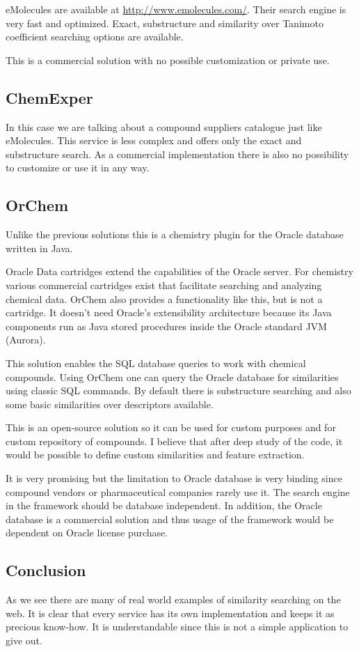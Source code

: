 \documentclass[thesis=M,english]{FITthesis}[2012/10/20]
\begin{document}
eMolecules are available at \url{http://www.emolecules.com/}. Their search engine is very fast and optimized. Exact, substructure and similarity over Tanimoto coefficient searching options are available.

This is a commercial solution with no possible customization or private use.

\subsection{ChemExper}
In this case we are talking about a compound suppliers catalogue just like eMolecules. This service is less complex and offers only the exact and substructure search. As a commercial implementation there is also no possibility to customize or use it in any way.

\subsection{OrChem}
Unlike the previous solutions this is a chemistry plugin for the Oracle database written in Java. 

Oracle Data cartridges extend the capabilities of the Oracle server. For chemistry various commercial cartridges exist that facilitate searching and analyzing chemical data. OrChem also provides a functionality like this, but is not a cartridge. It doesn't need Oracle's extensibility architecture because its Java components run as Java stored procedures inside the Oracle standard JVM (Aurora).\cite{orchem}

This solution enables the SQL database queries to work with chemical compounds. Using OrChem one can query the Oracle database for similarities using classic SQL commands. By default there is substructure searching and also some basic similarities over descriptors available.

This is an open-source solution so it can be used for custom purposes and for custom repository of compounds. I believe that after deep study of the code, it would be possible to define custom similarities and feature extraction.

It is very promising but the limitation to Oracle database is very binding since compound vendors or pharmaceutical companies rarely use it. The search engine in the framework should be database independent. In addition, the Oracle database is a commercial solution and thus usage of the framework would be dependent on Oracle license purchase.

\subsection{Conclusion}
As we see there are many of real world examples of similarity searching on the web. It is clear that every service has its own implementation and keeps it as precious know-how. It is understandable since this is not a simple application to give out.
\end{document}
